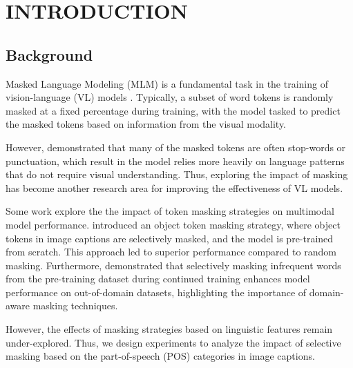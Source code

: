 \setlength{\parindent}{0in}
\setlength{\parskip}{1.5mm}
\setlength{\baselineskip}{1.6em}

\chapter{INTRODUCTION}
\section{Background}
Masked Language Modeling (MLM) is a fundamental task in the training of vision-language (VL) models \cite{albef, mplug, uniter, beit-3}. 
Typically, a subset of word tokens is randomly masked at a fixed percentage during training, with the model tasked to predict the masked tokens based on information from the visual modality. 

However,  demonstrated that many of the masked tokens are often stop-words or punctuation, which result in the model relies more heavily on language patterns that do not require visual understanding.
Thus, exploring the impact of masking has become another research area for improving the effectiveness of VL models.

Some work explore the the impact of token masking strategies on multimodal model performance. 
 introduced an object token masking strategy, where object tokens in image captions are selectively masked, and the model is pre-trained from scratch.
This approach led to superior performance compared to random masking. 
Furthermore,  demonstrated that selectively masking infrequent words from the pre-training dataset during continued training enhances model performance on out-of-domain datasets, highlighting the importance of domain-aware masking techniques.

However, the effects of masking strategies based on linguistic features remain under-explored. 
Thus, we design experiments to analyze the impact of selective masking based on the part-of-speech (POS) categories in image captions.

